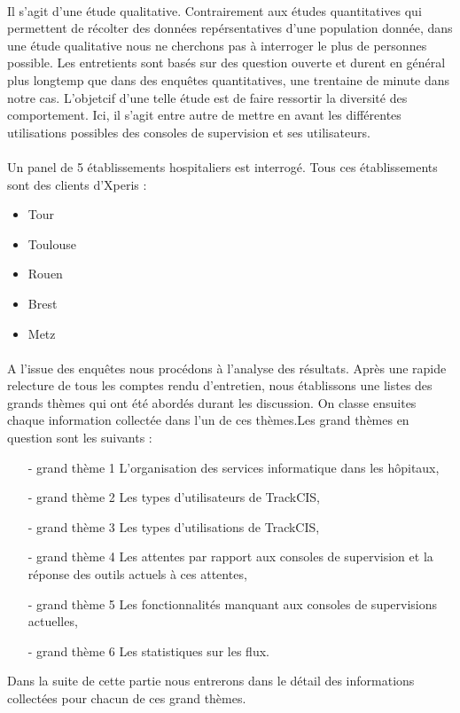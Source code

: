 			\paragraph{}%
			Il s'agit d'une étude qualitative. Contrairement aux études quantitatives qui
			permettent de récolter des données repérsentatives d'une population donnée,
			dans une étude qualitative nous ne cherchons pas à interroger le plus de
			personnes possible. Les entretients sont basés sur des question ouverte et
			durent en général plus longtemp que dans des enquêtes quantitatives, une
			trentaine de minute dans notre cas.
			L'objetcif d'une telle étude est de faire ressortir la diversité des
			comportement. Ici, il s'agit entre autre de mettre en avant les différentes
			utilisations possibles des consoles de supervision et ses utilisateurs.
			
			\paragraph{}%
			Un panel de 5 établissements hospitaliers est interrogé. Tous ces
			établissements sont des clients d’Xperis :
			\begin{itemize}
			  \item Tour
			  \item Toulouse
			  \item Rouen
			  \item Brest
			  \item Metz
			\end{itemize}
			
			\paragraph{}%
			A l'issue des enquêtes nous procédons à l'analyse des résultats. Après une
			rapide relecture de tous les comptes rendu d'entretien, nous établissons une
			listes des grands thèmes qui ont été abordés durant les discussion.
			On classe ensuites chaque information collectée dans l'un de ces
			thèmes.\newline Les grand thèmes en question sont les suivants :
			\begin{itemize}
			  \item[- grand thème 1] L’organisation des services informatique dans les
			  hôpitaux,
			  \item[- grand thème 2] Les types d’utilisateurs de TrackCIS,
			  \item[- grand thème 3] Les types d’utilisations de TrackCIS,
			  \item[- grand thème 4] Les attentes par rapport aux consoles de supervision
			  et la réponse des outils actuels à ces attentes,
			  \item[- grand thème 5] Les fonctionnalités manquant aux consoles de
			  supervisions actuelles,
			  \item[- grand thème 6] Les statistiques sur les flux.
			\end{itemize}
			Dans la suite de cette partie nous entrerons dans le détail des informations
			collectées pour chacun de ces grand thèmes.
			
